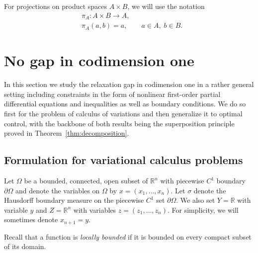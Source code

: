 \documentclass{article}
\newcommand{\R}{\mathbb{R}}
\theoremstyle{definition}
\theoremstyle{remark}
\newcommand{\proj}{\pi}
\begin{document}
For projections on product spaces $A\times B$, we will use the notation
\begin{align*}
    &\proj_{A}\colon A\times B\to A,\\
    &\proj_A(a,b)=a,\qquad a\in A,\; b\in B.
\end{align*}

%
%
%
%
%
%
%
%

%
%


%
%
%

%

%
%
%
%
%

%
%
%
%
%
%

%
%
%
%
%
%
%
 
%
%
%
%
%
%
%
%
%
%
%
%
 
%
%
%
%
%
%
%
%
%
%


%

\section{No gap in codimension one}
\label{sec:codim1}
In this section we study the relaxation gap in codimension one in a rather general setting including constraints in the form of nonlinear first-order partial differential equations and inequalities as well as boundary conditions. We do so first for the problem of calculus of variations and then generalize it to optimal control, with the backbone of both results being the superposition principle proved in Theorem~\ref{thm:decomposition}.
\subsection{Formulation for variational calculus problems}
\label{sec:lagrangian}

Let $\Omega$ be a bounded, connected, open subset of $\R^n$ with piecewise $C^1$ boundary $\partial \Omega$ and denote the variables on $\Omega$ by $x=(x_1,\dots,x_n)$. Let  $\sigma$ denote the Hausdorff boundary measure on the piecewise $C^1$ set $\partial \Omega$. %
%
%
%
%
We also set $Y=\R$ with variable $y$ and $Z=\R^n$ with variables $z=(z_1,\dots,z_n)$. For simplicity, we will sometimes denote $x_{n+1}=y$.

Recall that a function is \emph{locally bounded} if it is bounded on every compact subset of its domain.


%
%
%
%
%
%
%
%
%
\end{document}
